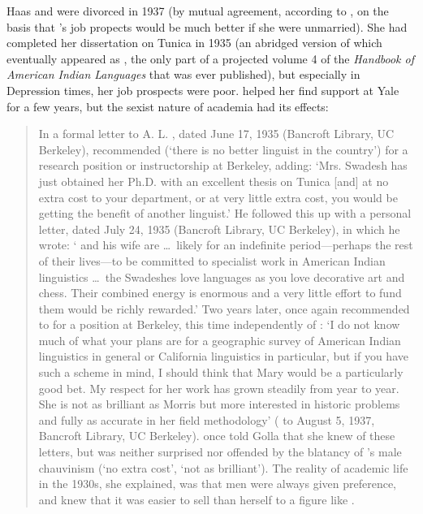 Haas and {\Swadesh} were divorced in 1937 
(by mutual agreement, according
to \citet{heaton.etal21:women.in.lx}, on the basis that {\Haas}'s job
propects would be much better if she were unmarried). She had
completed her dissertation on Tunica in 1935 (an abridged version of
which eventually appeared as \citealt{haas41:tunica}, the only part of
a projected volume 4 of the \textsl{Handbook of American Indian
  Languages} that was ever published), but especially in Depression
times, her job prospects were poor. {\Sapir} helped her find support at
Yale for a few years, but the sexist nature of academia had its
effects:
\begin{quotation}
  In a formal letter to A. L. {\Kroeber}, dated June 17, 1935 (Bancroft
  Library, UC Berkeley), {\Sapir} recommended {\Swadesh} (`there is no
  better linguist in the country') for a research position or
  instructorship at Berkeley, adding: `Mrs. Swadesh has just obtained
  her Ph.D. with an excellent thesis on Tunica [and] at no extra cost
  to your department, or at very little extra cost, you would be
  getting the benefit of another linguist.' He followed this up with a
  personal letter, dated July 24, 1935 (Bancroft Library, UC
  Berkeley), in which he wrote: `{\Swadesh} and his wife are \ldots\
  likely for an indefinite period---perhaps the rest of their
  lives---to be committed to specialist work in American Indian
  linguistics \ldots\ the Swadeshes love languages as you love
  decorative art and chess. Their combined energy is enormous and a
  very little effort to fund them would be richly rewarded.' Two years
  later, {\Sapir} once again recommended {\Haas} to {\Kroeber} for a position
  at Berkeley, this time independently of {\Swadesh}: `I do not know much
  of what your plans are for a geographic survey of American Indian
  linguistics in general or California linguistics in particular, but
  if you have such a scheme in mind, I should think that Mary {\Haas}
  would be a particularly good bet. My respect for her work has grown
  steadily from year to year. She is not as brilliant as Morris but
  more interested in historic problems and fully as accurate in her
  field methodology' ({\Sapir} to {\Kroeber} August 5, 1937, Bancroft
  Library, UC Berkeley). {\Haas} once told Golla\ia{Golla, Victor} that she knew of these
  letters, but was neither surprised nor offended by the blatancy of
  {\Sapir}'s male chauvinism (`no extra cost', `not as brilliant'). The
  reality of academic life in the 1930s, she explained, was that men
  were always given preference, and {\Sapir} knew that it was easier to
  sell {\Swadesh} than herself to a figure like {\Kroeber}.\\
  \citep[827, fn. 2]{golla.matisoff97:haas.obit}
\end{quotation}

